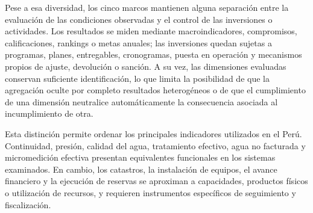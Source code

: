 Pese a esa diversidad, los cinco marcos mantienen alguna separación entre la evaluación de las condiciones observadas y el control de las inversiones o actividades. Los resultados se miden mediante macroindicadores, compromisos, calificaciones, rankings o metas anuales; las inversiones quedan sujetas a programas, planes, entregables, cronogramas, puesta en operación y mecanismos propios de ajuste, devolución o sanción. A su vez, las dimensiones evaluadas conservan suficiente identificación, lo que limita la posibilidad de que la agregación oculte por completo resultados heterogéneos o de que el cumplimiento de una dimensión neutralice automáticamente la consecuencia asociada al incumplimiento de otra.

Esta distinción permite ordenar los principales indicadores utilizados en el Perú. Continuidad, presión, calidad del agua, tratamiento efectivo, agua no facturada y micromedición efectiva presentan equivalentes funcionales en los sistemas examinados. En cambio, los catastros, la instalación de equipos, el avance financiero y la ejecución de reservas se aproximan a capacidades, productos físicos o utilización de recursos, y requieren instrumentos específicos de seguimiento y fiscalización.


